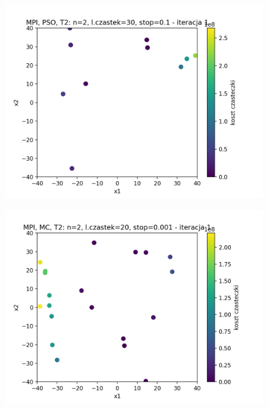 \documentclass[11pt, a4paper, oneside]{article}
\begin{document}
\begin{figure}[H]
\begin{minipage}[b]{\dimexpr.5\textwidth-1em}
  \label{fig:pozycjeStartowe:MC1}
\end{minipage}
\end{figure}

\begin{figure}[H]
\centering
\begin{minipage}[b]{\dimexpr.5\textwidth-1em}
  \centering
  \includegraphics[width=1\linewidth]{grafiki2/MPI_PSO_T2/MPI_PSO_T2_startPositions.png}
  \label{fig:pozycjeStartowe:PSO2}
\end{minipage} \hfill
\begin{minipage}[b]{\dimexpr.5\textwidth-1em}
  \centering
  \includegraphics[width=1\linewidth]{grafiki2/MPI_MC_T2/MPI_MC_T2_startPositions.png}
  \label{fig:pozycjeStartowe:MC2}
\end{minipage}
\end{figure}
\end{document}
